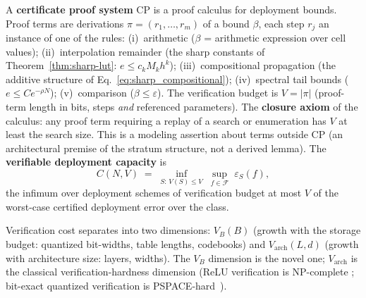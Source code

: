 \begin{definition}
\label{def:cp}
A \textbf{certificate proof system} $\text{CP}$ is a proof calculus for
deployment bounds. Proof terms are derivations $\pi = (r_1, \dots, r_m)$
of a bound $\beta$, each step $r_j$ an instance of one of the rules:
(i)~arithmetic ($\beta$ = arithmetic expression over cell values);
(ii)~interpolation remainder (the sharp constants of
Theorem~\ref{thm:sharp-lut}: $e \leq c_k M_k h^k$);
(iii)~compositional propagation (the additive structure of
Eq.~\eqref{eq:sharp_compositional}); (iv)~spectral tail bounds
($e \leq C e^{-\rho N}$); (v)~comparison ($\beta \leq \varepsilon$).
The verification budget is $V = |\pi|$ (proof-term length in bits,
steps \emph{and} referenced parameters). The \textbf{closure axiom} of
the calculus: any proof term requiring a replay of a search or
enumeration has $V$ at least the search size. This is a modeling
assertion about terms outside $\text{CP}$ (an architectural premise of
the stratum structure, not a derived lemma).
The \textbf{verifiable deployment capacity} is
\begin{equation}
C(N, V) \;=\; \inf_{S:\, V(S) \leq V} \;
\sup_{f \in \mathcal{F}} \; \varepsilon_S(f),
\label{eq:capacity-def}
\end{equation}
the infimum over deployment schemes of verification budget at most $V$
of the worst-case certified deployment error over the class.
\end{definition}

Verification cost separates into two dimensions: $V_B(B)$ (growth with
the storage budget: quantized bit-widths, table lengths, codebooks) and
$V_{\text{arch}}(L, d)$ (growth with architecture size: layers, widths).
The $V_B$ dimension is the novel one; $V_{\text{arch}}$ is the classical
verification-hardness dimension (ReLU verification is NP-complete
\cite{katz2017reluplex}; bit-exact quantized verification is
PSPACE-hard~\cite{hlz2021quantized}).

